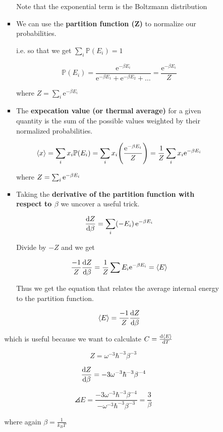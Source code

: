 \begin{enumerate}[label=(\alph*)]
\begin{itemize}
\begin{itemize}
\begin{itemize}
            Note that the exponential term is the Boltzmann distribution
    
            \item We can use the \textbf{partition function (Z)} to normalize our probabilities.
    
            i.e. so that we get $\sum_i \mathbb{P} (E_i) = 1$
    
            \[ \mathbb{P} (E_i) = \frac{\mathrm{e}^{-\beta E_i}}{\mathrm{e}^{-\beta E_1} + \mathrm{e}^{-\beta E_2} + \dots } = \frac{\mathrm{e}^{-\beta E_i}}{Z}\]
    
            where $Z = \sum_i \mathrm{e}^{-\beta E_i}$
    
            \item The \textbf{expecation value (or thermal average)} for a given quantity is the sum of the possible values weighted by their normalized probabilities.
    
            \[ \angles{x} = \sum_i x_i \Prob (E_i) = \sum_i x_i \paren*{\frac{\e^{-\beta E_i}}{Z}} = \recip{Z} \sum_i x_i \e^{-\beta E_i} \]
    
            where $ Z = \sum_i \mathrm{e}^{-\beta E_i} $
    
            \item Taking the \textbf{derivative of the partition function with respect to $\beta$} we uncover a useful trick.
    
            \[ \dv{Z}{\beta} = \sum_i \paren*{-E_i } \, \e^{-\beta E_i} \]
    
            Divide by $-Z$ and we get 
    
            \[ \frac{-1}{Z} \dv{Z}{\beta} = \frac{1}{Z} \sum E_i \mathrm{e}^{-\beta E_i} = \langle E\rangle\]
    
            Thus we get the equation that relates the average internal energy to the partition function.
    
            \[ \langle E\rangle = \frac{-1}{Z} \dv{Z}{\beta}\]
        \end{itemize}

        which is useful because we want to calculate $C = \dv{\langle E\rangle}{T}$

        \[ Z = \omega^{-3} \hbar^{-3} \beta^{-3}\]

        \[ \dv{Z}{\beta} = -3 \omega^{-3} \hbar^{-3} \beta^{-4} \]

        \[ \angles{E} = \frac{-3 \omega^{-3} \hbar^{-3} \beta^{-4}}{- \omega^{-3} \hbar^{-3} \beta^{-3}} = \frac{3}{\beta} \]

        where again $\beta = \frac{1}{k_B T}$


\end{itemize}
\end{itemize}
\end{enumerate}
